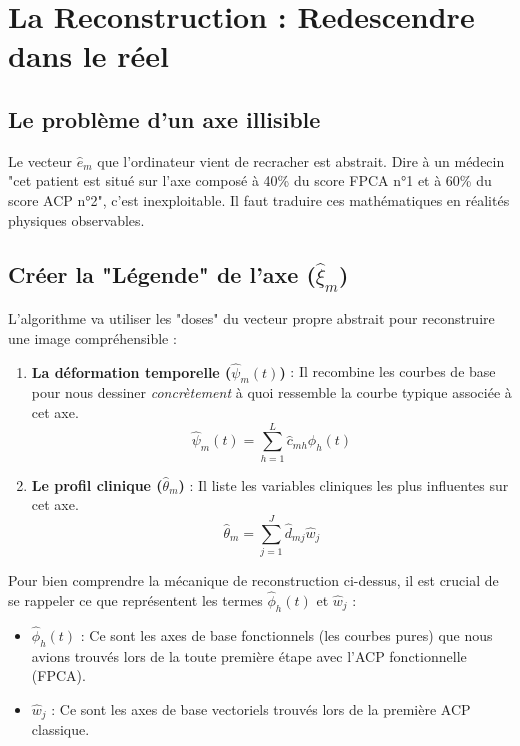 \documentclass[11pt, a4paper]{article}
\begin{document}
\section{La Reconstruction : Redescendre dans le réel}

\subsection{Le problème d'un axe illisible}
Le vecteur $\hat{e}_m$ que l'ordinateur vient de recracher est abstrait. Dire à un médecin "cet patient est situé sur l'axe composé à 40\% du score FPCA n°1 et à 60\% du score ACP n°2", c'est inexploitable. Il faut traduire ces mathématiques en réalités physiques observables.

\subsection{Créer la "Légende" de l'axe ($\hat{\xi}_m$)}
L'algorithme va utiliser les "doses" du vecteur propre abstrait pour reconstruire une image compréhensible :
\begin{enumerate}
    \item \textbf{La déformation temporelle ($\hat{\psi}_m(t)$)} : Il recombine les courbes de base pour nous dessiner \textit{concrètement} à quoi ressemble la courbe typique associée à cet axe.
    \begin{equation}
    \hat{\psi}_m(t) = \sum_{h=1}^L \hat{c}_{mh} \hat{\phi}_h(t)
    \end{equation}
    \item \textbf{Le profil clinique ($\hat{\theta}_m$)} : Il liste les variables cliniques les plus influentes sur cet axe.
    \begin{equation}
    \hat{\theta}_m = \sum_{j=1}^J \hat{d}_{mj} \hat{w}_j
    \end{equation}
\end{enumerate}

Pour bien comprendre la mécanique de reconstruction ci-dessus, il est crucial de se rappeler ce que représentent les termes $\hat{\phi}_h(t)$ et $\hat{w}_j$ :
\begin{itemize}
    \item $\hat{\phi}_h(t)$ : Ce sont les axes de base fonctionnels (les courbes pures) que nous avions trouvés lors de la toute première étape avec l'ACP fonctionnelle (FPCA).
    \item $\hat{w}_j$ : Ce sont les axes de base vectoriels trouvés lors de la première ACP classique.
\end{itemize}
\end{document}

